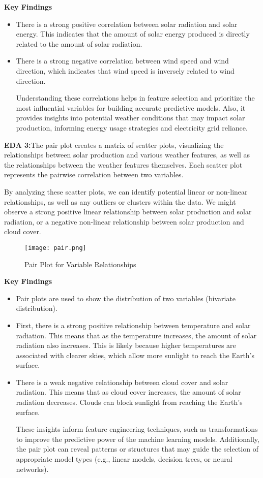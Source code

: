 \documentclass[conference]{IEEEtran}
\begin{document}
\textbf{Key Findings}
\begin{itemize}
\item There is a strong positive correlation between solar radiation and solar energy. This indicates that the amount of solar energy produced is directly related to the amount of solar radiation.
\item There is a strong negative correlation between wind speed and wind direction, which indicates that wind speed is inversely related to wind direction.

Understanding these correlations helps in feature selection and prioritize the most influential variables for building accurate predictive models. Also, it provides insights into potential weather conditions that may impact solar production, informing energy usage strategies and electricity grid reliance.

\end{itemize}

\textbf{EDA 3:}The pair plot creates a matrix of scatter plots, visualizing the relationships between solar production and various weather features, as well as the relationships between the weather features themselves. Each scatter plot represents the pairwise correlation between two variables.

By analyzing these scatter plots, we can identify potential linear or non-linear relationships, as well as any outliers or clusters within the data. We might observe a strong positive linear relationship between solar production and solar radiation, or a negative non-linear relationship between solar production and cloud cover.
\begin{figure}[H] %
    \centering
    \texttt{[image: pair.png]}
    \caption{Pair Plot for Variable Relationships}
    \label{fig:technical_workflow}
\end{figure}
\textbf{Key Findings}
\begin{itemize}
\item Pair plots are used to show the distribution of two variables (bivariate distribution).
\item First, there is a strong positive relationship between temperature and solar radiation. This means that as the temperature increases, the amount of solar radiation also increases. This is likely because higher temperatures are associated with clearer skies, which allow more sunlight to reach the Earth's surface.
\item There is a weak negative relationship between cloud cover and solar radiation. This means that as cloud cover increases, the amount of solar radiation decreases. Clouds can block sunlight from reaching the Earth's surface.

These insights inform feature engineering techniques, such as transformations to improve the predictive power of the machine learning models. Additionally, the pair plot can reveal patterns or structures that may guide the selection of appropriate model types (e.g., linear models, decision trees, or neural networks).
\end{itemize}
\end{document}
